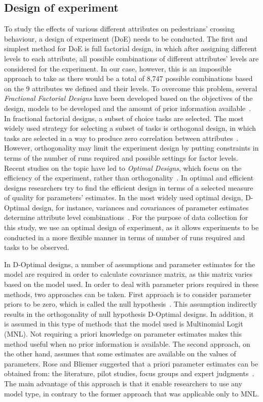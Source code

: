 \subsection{Design of experiment}
To study the effects of various different attributes on pedestrians' crossing behaviour, a design of experiment (DoE) needs to be conducted. The first and simplest method for DoE is full factorial design, in which after assigning different levels to each attribute, all possible combinations of different attributes' levels are considered for the experiment. In our case, however, this is an impossible approach to take as there would be a total of 8,747 possible combinations based on the 9 attributes we defined and their levels. To overcome this problem, several \textit{Fractional Factorial Designs} have been developed based on the objectives of the design, models to be developed and the amount of prior information available~\citep{cavalcante2011bayesian}. In fractional factorial designs, a subset of choice tasks are selected. The most widely used strategy for selecting a subset of tasks is orthogonal design, in which tasks are selected in a way to produce zero correlation between attributes~\citep{ortuzar1994modelling}. However, orthogonality may limit the experiment design by putting constraints in terms of the number of runs required and possible settings for factor levels. Recent studies on the topic have led to \textit{Optimal Designs}, which focus on the efficiency of the experiment, rather than orthogonality~\citep{rose2009constructing}. In optimal and efficient designs researchers try to find the efficient design in terms of a selected measure of quality for parameters' estimates. In the most widely used optimal design, D-Optimal design, for instance, variances and covariances of parameter estimates determine attribute level combinations~\citep{atkinson2007optimum}. For the purpose of data collection for this study, we use an optimal design of experiment, as it allows experiments to be conducted in a more flexible manner in terms of number of runs required and tasks to be observed. 

In D-Optimal designs, a number of assumptions and parameter estimates for the model are required in order to calculate covariance matrix, as this matrix varies based on the model used. In order to deal with parameter priors required in these methods, two approaches can be taken. First approach is to consider parameter priors to be zero, which is called the null hypothesis~\citep{street2005quick}. This assumption indirectly results in the orthogonality of null hypothesis D-Optimal designs. In addition, it is assumed in this type of methods that the model used is Multinomial Logit (MNL). Not requiring a priori knowledge on parameter estimates makes this method useful when no prior information is available. The second approach, on the other hand, assumes that some estimates are available on the values of parameters. Rose and Bliemer suggested that a priori parameter estimates can be obtained from: the literature, pilot studies, focus groups and expert judgments~\citep{rose2008designing}. The main advantage of this approach is that it enable researchers to use any model type, in contrary to the former approach that was applicable only to MNL.

